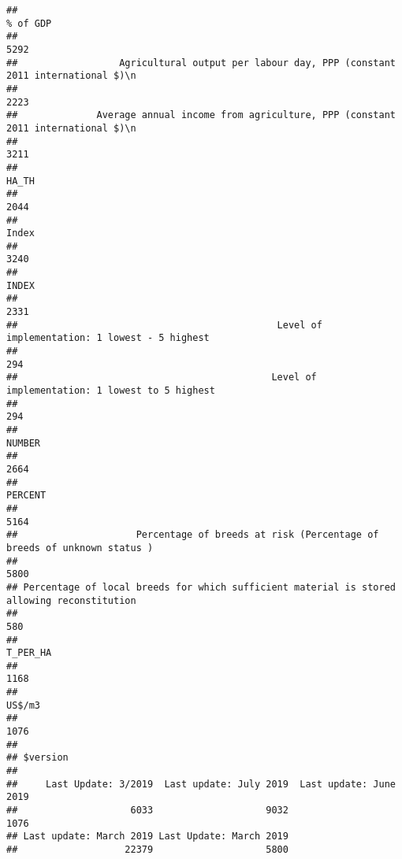 \documentclass[]{article}
\begin{document}
\begin{verbatim}
##                                                                                   % of GDP 
##                                                                                       5292 
##                  Agricultural output per labour day, PPP (constant 2011 international $)\n 
##                                                                                       2223 
##              Average annual income from agriculture, PPP (constant 2011 international $)\n 
##                                                                                       3211 
##                                                                                      HA_TH 
##                                                                                       2044 
##                                                                                      Index 
##                                                                                       3240 
##                                                                                      INDEX 
##                                                                                       2331 
##                                              Level of implementation: 1 lowest - 5 highest 
##                                                                                        294 
##                                             Level of implementation: 1 lowest to 5 highest 
##                                                                                        294 
##                                                                                     NUMBER 
##                                                                                       2664 
##                                                                                    PERCENT 
##                                                                                       5164 
##                     Percentage of breeds at risk (Percentage of breeds of unknown status ) 
##                                                                                       5800 
## Percentage of local breeds for which sufficient material is stored allowing reconstitution 
##                                                                                        580 
##                                                                                   T_PER_HA 
##                                                                                       1168 
##                                                                                     US$/m3 
##                                                                                       1076 
## 
## $version
## 
##     Last Update: 3/2019  Last update: July 2019  Last update: June 2019 
##                    6033                    9032                    1076 
## Last update: March 2019 Last Update: March 2019 
##                   22379                    5800
\end{verbatim}
\end{document}
